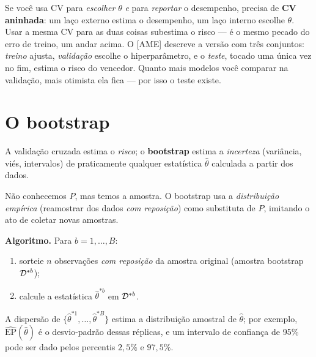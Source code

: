 \documentclass[11pt,a4paper]{article}
\begin{document}
\begin{atencao}
Se você usa CV para \emph{escolher} $\theta$ \emph{e} para \emph{reportar} o
desempenho, precisa de \textbf{CV aninhada}: um laço externo estima o desempenho,
um laço interno escolhe $\theta$. Usar a mesma CV para as duas coisas subestima o
risco --- é o mesmo pecado do erro de treino, um andar acima. O [AME] descreve a
versão com três conjuntos: \emph{treino} ajusta, \emph{validação} escolhe o
hiperparâmetro, e o \emph{teste}, tocado uma única vez no fim, estima o risco do
vencedor. Quanto mais modelos você comparar na validação, mais otimista ela fica ---
por isso o teste existe.
\end{atencao}

\section{O bootstrap}
A validação cruzada estima o \emph{risco}; o \textbf{bootstrap} estima a
\emph{incerteza} (variância, viés, intervalos) de praticamente qualquer
estatística $\widehat\theta$ calculada a partir dos dados.

\begin{ideia}
Não conhecemos $P$, mas temos a amostra. O bootstrap usa a \emph{distribuição
empírica} (reamostrar dos dados \emph{com reposição}) como substituta de $P$,
imitando o ato de coletar novas amostras.
\end{ideia}

\noindent\textbf{Algoritmo.} Para $b=1,\dots,B$:
\begin{enumerate}[leftmargin=1.6cm,nosep]
  \item sorteie $n$ observações \emph{com reposição} da amostra original (amostra
        bootstrap $\mathcal{D}^{*b}$);
  \item calcule a estatística $\widehat\theta^{*b}$ em $\mathcal{D}^{*b}$.
\end{enumerate}
A dispersão de $\{\widehat\theta^{*1},\dots,\widehat\theta^{*B}\}$ estima a
distribuição amostral de $\widehat\theta$; por exemplo,
$\widehat{\mathrm{EP}}(\widehat\theta)$ é o desvio-padrão dessas réplicas, e um
intervalo de confiança de 95\% pode ser dado pelos percentis $2{,}5\%$ e $97{,}5\%$.
\end{document}
